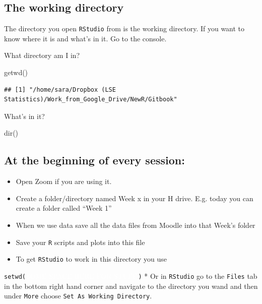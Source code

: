 \documentclass[
]{gitbook}
\newenvironment{Shaded}{\begin{snugshade}}{\end{snugshade}}
\newcommand{\FunctionTok}[1]{\textcolor[rgb]{0.00,0.00,0.00}{#1}}
\newcommand{\NormalTok}[1]{#1}
\providecommand{\tightlist}{%
  \setlength{\itemsep}{0pt}\setlength{\parskip}{0pt}}
\begin{document}
\hypertarget{the-working-directory}{%
\subsection{The working directory}\label{the-working-directory}}

The directory you open \texttt{RStudio} from is the working directory. If you want to know where it is and what's in it. Go to the console.

What directory am I in?

\begin{Shaded}
\begin{Highlighting}[]
\FunctionTok{getwd}\NormalTok{()}
\end{Highlighting}
\end{Shaded}

\begin{verbatim}
## [1] "/home/sara/Dropbox (LSE Statistics)/Work_from_Google_Drive/NewR/Gitbook"
\end{verbatim}

What's in it?

\begin{Shaded}
\begin{Highlighting}[]
\FunctionTok{dir}\NormalTok{()}
\end{Highlighting}
\end{Shaded}

\hypertarget{at-the-beginning-of-every-session}{%
\subsection{At the beginning of every session:}\label{at-the-beginning-of-every-session}}

\begin{itemize}
\tightlist
\item
  Open Zoom if you are using it.
\item
  Create a folder/directory named Week x in your H drive. E.g. today you can create a folder called ``Week 1''
\item
  When we use data save all the data files from Moodle into that Week's folder
\item
  Save your \texttt{R} scripts and plots into this file
\item
  To get \texttt{RStudio} to work in this directory you use
\end{itemize}

\texttt{setwd(}\(\color{white}{\text{SOME SPACE HERE FOR STUFF}}\)\texttt{)}
* Or in \texttt{RStudio} go to the \texttt{Files} tab in the bottom right hand corner and navigate to the directory you wand and then under \texttt{More} choose \texttt{Set\ As\ Working\ Directory}.
\end{document}
